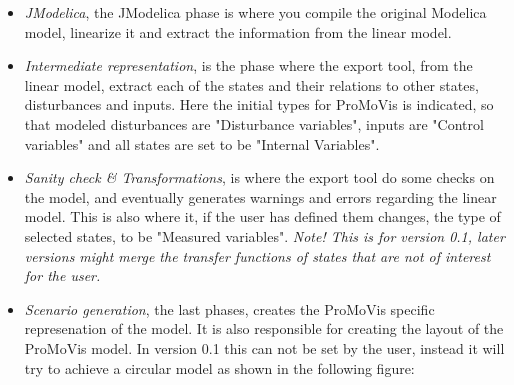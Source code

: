 \documentclass{report}
\begin{document}
\begin{itemize}
\item \textit{JModelica}, the JModelica phase is where you compile the original Modelica model, linearize it and extract the information from the linear model.
\item \textit{Intermediate representation}, is the phase where the export tool, from the linear model, extract each of the states and their relations to other states, disturbances and inputs. Here the initial types for ProMoVis is indicated, so that modeled disturbances are "Disturbance variables", inputs are "Control variables" and all states are set to be "Internal Variables".
\item \textit{Sanity check \& Transformations}, is where the export tool do some checks on the model, and eventually generates warnings and errors regarding the linear model. This is also where it, if the user has defined them changes, the type of selected states, to be "Measured variables". \newline \textit{Note! This is for version 0.1, later versions might merge the transfer functions of states that are not of interest for the user.}
\item \textit{Scenario generation}, the last phases, creates the ProMoVis specific represenation of the model. It is also responsible for creating the layout of the ProMoVis model. In version 0.1 this can not be set by the user, instead it will try to achieve a circular model as shown in the following figure:  



\end{itemize}
\end{document}
